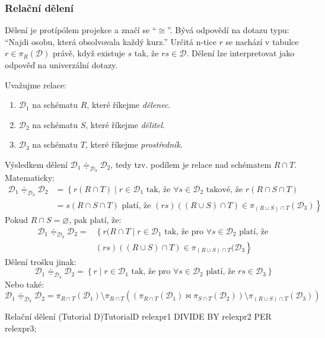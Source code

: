 \subsubsection{Relační dělení}
Dělení je protípólem projekce a značí se \enquote{$\cong$}. Bývá odpovědí na dotazu typu: \enquote{Najdi osobu, která obsolvovala každý kurz.} Určitá n-tice $r$ se nachází v tabulce $r \in \pi_{R} (\mathcal{D})$ právě, když existuje $s$ tak, že $rs \in \mathcal{D}$. Dělení lze interpretovat jako odpověď na univerzální dotazy.

Uvažujme relace:
\begin{enumerate}
\item $\mathcal{D}_{1}$ na schématu $R$, které říkejme \textit{dělenec}.
\item $\mathcal{D}_{2}$ na schématu $S$, které říkejme \textit{dělitel}.
\item $\mathcal{D}_{3}$ na schématu $T$, které říkejme \textit{prostředník}.
\end{enumerate}
Výsledkem dělení $\mathcal{D}_{1} \doteqdot_{\mathcal{D}_{3}} \mathcal{D}_{2}$, tedy tzv. podílem je relace nad schématem $R \cap T$. Matematicky:
\begin{align*}
\mathcal{D}_{1} \doteqdot_{\mathcal{D}_{3}} \mathcal{D}_{2} &= \left\{ r(R \cap T) \; | \; r \in \mathcal{D}_{1} \text{ tak, že } \forall s \in \mathcal{D}_{2} \text{ takové, že } r(R \cap S \cap T) \right. \\
&\left.= s(R \cap S \cap T) \text{ platí, že } (rs) ((R \cup S) \cap T) \in \pi_{(R \cup S) \cap T} (\mathcal{D}_{3}) \right\}
\end{align*}
Pokud $R \cap S = \varnothing$, pak platí, že:
\begin{align*}
\mathcal{D}_{1} \doteqdot_{\mathcal{D}_{3}} \mathcal{D}_{2} = &\left\{ r(R \cap T \; | \;  r \in \mathcal{D}_{1} \text{ tak, že pro } \forall s \in \mathcal{D}_{2}  \text{ platí, že } \right. \\
&\left.(rs) \left( \left(R \cup S\right) \cap T\right) \in \pi_{(R \cup S) \cap T} (\mathcal{D}_{3} \right\}
\end{align*}
Dělení trošku jinak:
$$
\mathcal{D}_{1} \doteqdot_{\mathcal{D}_{3}} \mathcal{D}_{2} = \left\{ r \; | \; r \in \mathcal{D}_{1} \text{ tak, že pro } \forall s \in \mathcal{D}_{2} \text{ platí, že } rs \in \mathcal{D}_{3} \right\}
$$
Nebo také:
$$
\mathcal{D}_{1} \doteqdot_{\mathcal{D}_{3}} \mathcal{D}_{2} = \pi_{R \cap T} \left( \mathcal{D}_{1} \right) \setminus \pi_{R \cap T} \left( \left( \pi_{R \cap T} \left( \mathcal{D}_{1} \right) \Join \pi_{S \cap T} \left( \mathcal{D}_{2} \right) \right) \setminus \pi_{(R \cup S) \cap T} \left( \mathcal{D}_{3} \right) \right)
$$
\begin{upcode}{Relační dělení (Tutorial D)}{}{TutorialD}
relexpr1 DIVIDE BY relexpr2 PER relexpr3;
\end{upcode}

